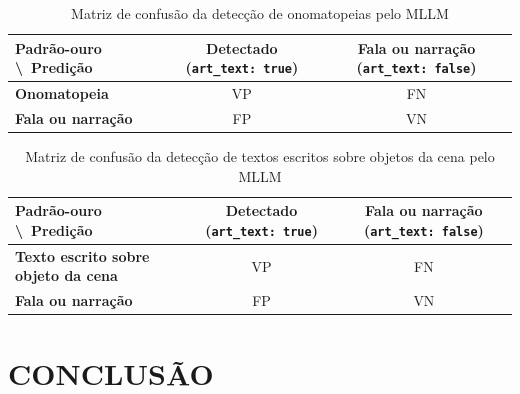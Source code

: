 \documentclass[
    12pt,
    openright,
    oneside,
    a4paper,
    chapter=TITLE,
    section=TITLE,
    english,
    brazilian,
    brazil
]{abntex2}
\renewcommand{\footnotesize}{\fontsize{10pt}{12pt}\selectfont}
\begin{document}
\begin{table}[htb]
    \caption{Matriz de confusão da detecção de onomatopeias pelo MLLM}
    \label{tab:matriz-onomatopeias}
    \centering
    \footnotesize
    \renewcommand{\arraystretch}{1.25}
    \begin{tabular}{|l|c|c|}
        \hline
        \textbf{Padrão-ouro \textbackslash\ Predição} & \textbf{Detectado (\texttt{art\_text: true})} & \textbf{Fala ou narração (\texttt{art\_text: false})} \\
        \hline
        \textbf{Onomatopeia} & VP & FN \\
        \hline
        \textbf{Fala ou narração} & FP & VN \\
        \hline
    \end{tabular}
\end{table}

\begin{table}[htb]
    \caption{Matriz de confusão da detecção de textos escritos sobre objetos da cena pelo MLLM}
    \label{tab:matriz-texto-cena}
    \centering
    \footnotesize
    \renewcommand{\arraystretch}{1.25}
    \begin{tabular}{|l|c|c|}
        \hline
        \textbf{Padrão-ouro \textbackslash\ Predição} & \textbf{Detectado (\texttt{art\_text: true})} & \textbf{Fala ou narração (\texttt{art\_text: false})} \\
        \hline
        \textbf{Texto escrito sobre objeto da cena} & VP & FN \\
        \hline
        \textbf{Fala ou narração} & FP & VN \\
        \hline
    \end{tabular}
\end{table}

\chapter{CONCLUSÃO}

\postextual


\end{document}
